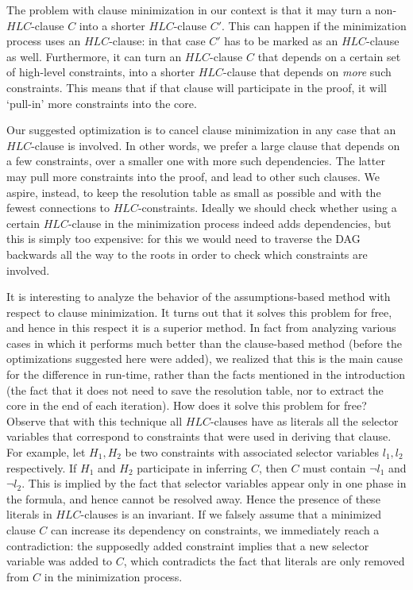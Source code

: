 \documentclass[twoside,11pt]{article}
\begin{document}
The problem with clause minimization in our context is that it may turn a non-$HLC$-clause $C$ into a shorter $HLC$-clause $C'$. This can happen if the minimization process uses an $HLC$-clause: in that case $C'$ has to be marked as an $HLC$-clause as well. Furthermore, it can turn an $HLC$-clause $C$ that depends on a certain set of high-level constraints, into a shorter $HLC$-clause that depends on \emph{more} such constraints. This means that if that clause will participate in the proof, it will `pull-in' more constraints into the core.

Our suggested optimization is to cancel clause minimization in any case that an $HLC$-clause is involved. In other words, we prefer a large clause that depends on a few constraints, over a smaller one with more such dependencies. The latter may pull more constraints into the proof, and lead to other such clauses. We aspire, instead, to keep the resolution table as small as possible and with the fewest connections to $HLC$-constraints. Ideally we should check whether using a certain $HLC$-clause in the minimization process indeed adds dependencies, but this is simply too expensive: for this we would need to traverse the DAG backwards all the way to the roots in order to check which constraints are involved.

It is interesting to analyze the behavior of the assumptions-based method
with respect to clause minimization. It turns out that it solves this problem
for free, and hence in this respect it is a superior method. In fact from
analyzing various cases in which it performs much better than the
clause-based method (before the optimizations suggested here were added), we
realized that this is the main cause for the difference in run-time, rather
than the facts mentioned in the introduction (the fact that it does not need
to save the resolution table, nor to extract the core in the end of each
iteration). How does it solve this problem for free? Observe that with this
technique all $HLC$-clauses have as literals all the selector variables that
correspond to constraints that were used in deriving that clause. For
example, let $H_1, H_2$ be two constraints with associated selector variables
$l_1,l_2$ respectively. If $H_1$ and $H_2$ participate in inferring $C$, then
$C$ must contain $\lnot l_1$ and $\lnot l_2$. This is implied by the fact
that selector variables appear only in one phase in the formula, and hence
cannot be resolved away. Hence the presence of
these literals in $HLC$-clauses is an invariant. If we falsely assume that a
minimized clause $C$ can increase its dependency on constraints, we
immediately reach a contradiction: the supposedly added constraint implies
that a new selector variable was added to $C$, which contradicts the fact
that literals are only removed from $C$ in the minimization process.
\end{document}
